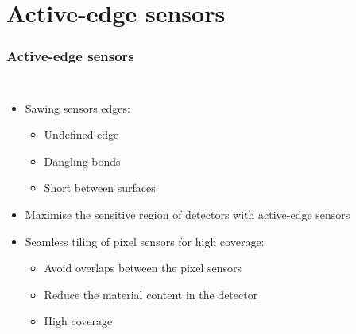 \section{Active-edge sensors}
\begin{frame}
  \frametitle{}
  \tableofcontents[currentsection]
\end{frame}
\begin{frame}
  \frametitle{Active-edge sensors}

  \begin{columns}

    \begin{itemize}
    \item Sawing sensors edges:
      \begin{itemize}
      \item Undefined edge
      \item Dangling bonds
      \item Short between surfaces
      \end{itemize}
    \item Maximise the sensitive region of detectors with active-edge
      sensors
    \item Seamless tiling of pixel sensors for high coverage:
      \begin{itemize}
      \item Avoid overlaps between the pixel sensors
      \item Reduce the material content in the detector
      \item High coverage
      \end{itemize}
    \end{itemize}


\end{columns}
\end{frame}
